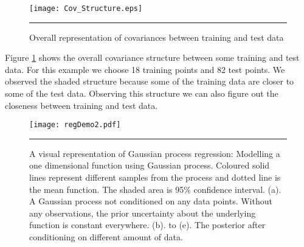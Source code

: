 \begin{figure}[t]
	\centering
		\texttt{[image: Cov\_Structure.eps]}
		\rule{35em}{0.5pt}
	\caption[Overall representation of covariances between training and test data]
		{Overall representation of covariances between training and test data}
	\label{fig:Covariances_Structure}
\end{figure}

Figure \ref{fig:Covariances_Structure} shows the overall covariance structure between some training and test data. For this example we choose 18 training points and 82 test points. We observed the shaded structure because some of the training data are closer to some of the test data. Observing this structure we can also figure out the closeness between training and test data. 

\begin{figure}
	\centering
		\texttt{[image: regDemo2.pdf]}
		\rule{35em}{0.5pt}
	\caption[A visual representation of Gaussian process regression: Modelling a one dimensional function using Gaussian process]
		{A visual representation of Gaussian process regression: Modelling a one dimensional function using Gaussian process. Coloured solid lines represent different samples from the process and dotted line is the mean function. The shaded area is 95\% confidence interval. (a). A Gaussian process not conditioned on any data points. Without any observations, the prior uncertainty about the underlying function is constant everywhere. (b). to (e). The posterior after conditioning on different amount of data.}
	\label{fig:dempGPReg}
\end{figure}

